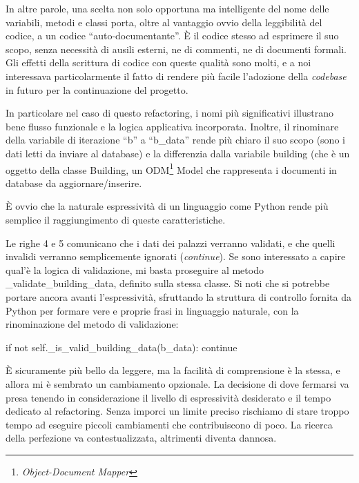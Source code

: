 \documentclass[12pt]{report}
\begin{document}
In altre parole, una scelta non solo opportuna ma intelligente del nome delle
variabili, metodi e classi porta, oltre al vantaggio ovvio della leggibilità
del codice, a un codice ``auto-documentante''. È il codice stesso ad esprimere
il suo scopo, senza necessità di ausili esterni, ne di commenti, ne di documenti
formali. Gli effetti della scrittura di codice con queste qualità sono molti, 
e a noi interessava particolarmente il fatto di rendere più facile l'adozione
della \textit{codebase} in futuro per la continuazione del progetto.

In particolare nel caso di questo refactoring, i nomi più significativi
illustrano bene flusso funzionale e la logica applicativa incorporata.
Inoltre, il rinominare della variabile di iterazione ``b'' a ``b\_data'' rende
più chiaro il suo scopo (sono i dati letti da inviare al database) 
e la differenzia dalla variabile building (che è un oggetto della
classe Building, un ODM\footnote{\textit{Object-Document Mapper}} Model che
rappresenta i documenti in database da aggiornare/inserire. 

È ovvio che la naturale espressività di un linguaggio come Python rende
più semplice il raggiungimento di queste caratteristiche. 

Le righe 4 e 5 comunicano che i dati dei palazzi verranno validati, 
e che quelli invalidi verranno semplicemente ignorati (\textit{continue}). 
Se sono interessato a capire qual'è la logica di validazione, mi basta
proseguire al metodo \_validate\_building\_data, definito 
sulla stessa classe. Si noti che si potrebbe portare ancora avanti 
l'espressività, sfruttando la struttura di controllo fornita da Python 
per formare vere e proprie frasi in linguaggio naturale, con la 
rinominazione del metodo di validazione:

\begin{python}
if not self._is_valid_building_data(b_data):
    continue
\end{python}

È sicuramente più bello da leggere, ma la facilità di comprensione è la stessa,
e allora mi è sembrato un cambiamento opzionale. La decisione di dove fermarsi
va presa tenendo in considerazione il livello di espressività desiderato
e il tempo dedicato al refactoring. Senza imporci un limite preciso rischiamo
di stare troppo tempo ad eseguire piccoli cambiamenti che contribuiscono
di poco. La ricerca della perfezione va contestualizzata, altrimenti diventa
dannosa.
\end{document}
